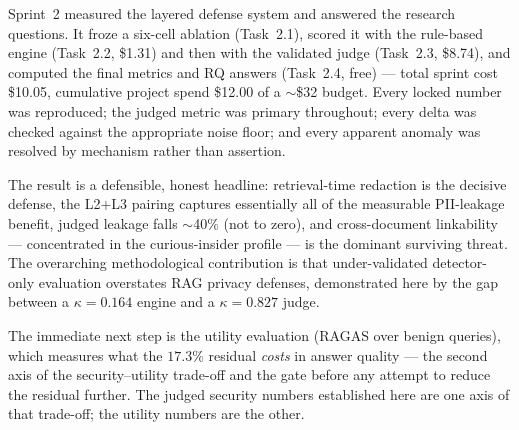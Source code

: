 \documentclass[11pt,a4paper]{article}
\newcommand{\kp}{\ensuremath{\kappa}}
\begin{document}
Sprint~2 measured the layered defense system and answered the research questions. It froze a six-cell ablation (Task~2.1), scored it with the rule-based engine (Task~2.2, \$1.31) and then with the validated judge (Task~2.3, \$8.74), and computed the final metrics and RQ answers (Task~2.4, free) --- total sprint cost \$10.05, cumulative project spend \$12.00 of a $\sim$\$32 budget. Every locked number was reproduced; the judged metric was primary throughout; every delta was checked against the appropriate noise floor; and every apparent anomaly was resolved by mechanism rather than assertion.

The result is a defensible, honest headline: retrieval-time redaction is the decisive defense, the L2+L3 pairing captures essentially all of the measurable PII-leakage benefit, judged leakage falls $\sim$40\% (not to zero), and cross-document linkability --- concentrated in the curious-insider profile --- is the dominant surviving threat. The overarching methodological contribution is that under-validated detector-only evaluation overstates RAG privacy defenses, demonstrated here by the gap between a $\kp = 0.164$ engine and a $\kp = 0.827$ judge.

The immediate next step is the utility evaluation (RAGAS over benign queries), which measures what the $17.3\%$ residual \emph{costs} in answer quality --- the second axis of the security--utility trade-off and the gate before any attempt to reduce the residual further. The judged security numbers established here are one axis of that trade-off; the utility numbers are the other.

\appendix
\end{document}
